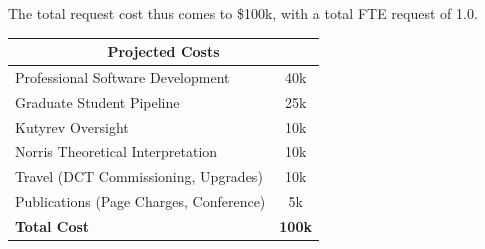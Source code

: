 \documentclass[letterpaper,11pt]{article}
\begin{document}
The total request cost thus comes to \$100k, with a total FTE request of 1.0.

\smallskip

\begin{center}
\begin{tabular}{lc}
\multicolumn{2}{c}{\textbf{Projected Costs}} \\
\hline
Professional Software Development & 40k \\
Graduate Student Pipeline & 25k \\
Kutyrev Oversight & 10k \\
Norris Theoretical Interpretation & 10k \\
Travel (DCT Commissioning, Upgrades) & 10k \\
Publications (Page Charges, Conference) & 5k \\
\hline
\textbf{Total Cost} & \textbf{100k} \\
\end{tabular}
\end{center}

\end{document}

